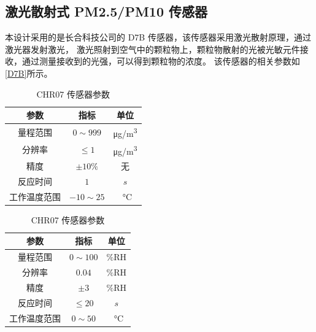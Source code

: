 \documentclass[12pt,hyperref,a4paper,UTF8]{ctexart}
\begin{document}
\subsection{激光散射式 PM2.5/PM10 传感器}
本设计采用的是长合科技公司的 D7B 传感器，该传感器采用激光散射原理，通过激光器发射激光，
激光照射到空气中的颗粒物上，颗粒物散射的光被光敏元件接收，通过测量接收到的光强，可以得到颗粒物的浓度。
该传感器的相关参数如\autoref{D7B}所示。
\begin{table}[htbp]
    \centering
    \begin{minipage}{0.45\textwidth}
        \centering
        \caption{D7B 传感器参数}
        \begin{tabular}{ccc}
            \toprule
            参数     & 指标            & 单位                  \\ \midrule
            量程范围   & $0\sim 999 $  & \unit{\ug /m^3}     \\
            分辨率    & $\leqslant 1$ & \unit{\ug /m^3}     \\
            精度     & $\pm 10\%$    & 无                   \\
            反应时间   & $1$           & $s$                 \\
            工作温度范围 & $-10 \sim 25$ & \SI{}\degreeCelsius \\
            \bottomrule
        \end{tabular}
        \label{D7B}
    \end{minipage}
    \begin{minipage}{0.45\textwidth}
        \centering
        \caption{CHR07 传感器参数}
        \begin{tabular}{ccc}
            \toprule
            参数     & 指标             & 单位                  \\ \midrule
            量程范围   & $0\sim 100 $   & $\%\text{RH}$       \\
            分辨率    & $0.04$         & $\%\text{RH}$       \\
            精度     & $\pm 3$        & $\%\text{RH}$       \\
            反应时间   & $\leqslant 20$ & $s$                 \\
            工作温度范围 & $0 \sim 50$    & \SI{}\degreeCelsius \\
            \bottomrule
        \end{tabular}
        \label{CHR07}
    \end{minipage}
\end{table}
\end{document}
